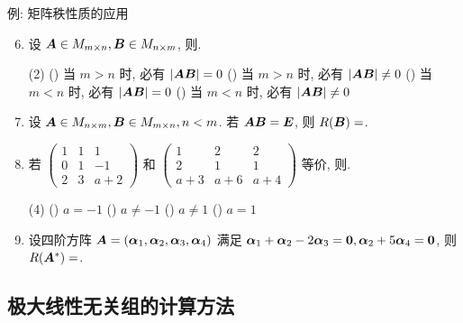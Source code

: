 \begin{frame}{例: 矩阵秩性质的应用}
	\begin{exercise}
		\begin{enumerate}[<*>]
			\setcounter{enumi}{5}
			\item 设 ${\boldsymbol{A}}\in M_{m\times n},{\boldsymbol{B}}\in M_{n\times m}$, 则.
			\begin{taskschoice}(2)
				() 当 $m>n$ 时, 必有 $|{\boldsymbol{A}}{\boldsymbol{B}}|=0$
				() 当 $m>n$ 时, 必有 $|{\boldsymbol{A}}{\boldsymbol{B}}|\neq0$
				() 当 $m<n$ 时, 必有 $|{\boldsymbol{A}}{\boldsymbol{B}}|=0$
				() 当 $m<n$ 时, 必有 $|{\boldsymbol{A}}{\boldsymbol{B}}|\neq0$
			\end{taskschoice}
			\item 设 ${\boldsymbol{A}}\in M_{n\times m},{\boldsymbol{B}}\in M_{m\times n},n<m$. 若 ${\boldsymbol{A}}{\boldsymbol{B}}={\boldsymbol{E}}$, 则 $R({\boldsymbol{B}})=$.
			\item 若 $\begin{pmatrix}
				1&1&1\\0&1&-1\\2&3&a+2
			\end{pmatrix}$ 和 $\begin{pmatrix}
				1&2&2\\2&1&1\\a+3&a+6&a+4
			\end{pmatrix}$ 等价, 则.
			\begin{taskschoice}(4)
				() $a=-1$
				() $a\neq-1$
				() $a\neq 1$
				() $a=1$
			\end{taskschoice}
			\item 设四阶方阵 ${\boldsymbol{A}}=({\boldsymbol{\alpha}}_1,{\boldsymbol{\alpha}}_2,{\boldsymbol{\alpha}}_3,{\boldsymbol{\alpha}}_4)$ 满足 ${\boldsymbol{\alpha}}_1+{\boldsymbol{\alpha}}_2-2{\boldsymbol{\alpha}}_3={\bf0},{\boldsymbol{\alpha}}_2+5{\boldsymbol{\alpha}}_4={\bf0}$, 则 $R({\boldsymbol{A}}^*)=$.
		\end{enumerate}
	\end{exercise}
\end{frame}


\subsection{极大线性无关组的计算方法}

